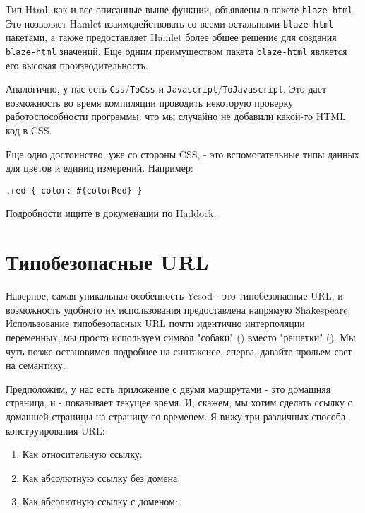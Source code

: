 Тип Html, как и все описанные выше функции, объявлены в пакете 
\texttt{blaze-html}. Это позволяет Hamlet взаимодействовать со всеми 
остальными \texttt{blaze-html} пакетами, а также предоставляет Hamlet 
более общее решение для создания \texttt{blaze-html} значений. 
Еще одним преимуществом пакета \texttt{blaze-html} является 
его высокая производительность.

Аналогично, у нас есть \lstinline!Css!/\lstinline!ToCss! и 
\lstinline!Javascript!/\lstinline!ToJavascript!. Это дает возможность во время
компиляции проводить некоторую проверку работоспособности программы: что мы 
случайно не добавили какой-то HTML код в CSS.

Еще одно достоинство, уже со стороны CSS, - это вспомогательные типы данных для 
цветов и единиц измерений. Например: 

\begin{lstlisting}
.red { color: #{colorRed} }
\end{lstlisting}

Подробности ищите в докуменации по Haddock.

\section{Типобезопасные URL}
Наверное, самая уникальная особенность Yesod - это типобезопасные URL, и 
возможность удобного их использования предоставлена напрямую Shakespeare.
Использование типобезопасных URL почти идентично интерполяции переменных,
мы просто используем символ "собаки" () вместо "решетки" (\textt{#}).
Мы чуть позже остановимся подробнее на синтаксисе, сперва, давайте прольем свет
на семантику.

Предположим, у нас есть приложение с двумя маршрутами 
 - это домашняя страница, и 
 - показывает текущее время.
И, скажем, мы хотим сделать ссылку с домашней страницы на страницу со временем.
Я вижу три различных способа конструирования URL:
\begin{enumerate}
  \item Как относительную ссылку: 
  \item Как абсолютную ссылку без домена: 
  \item Как абсолютную ссылку с доменом: 
\end{enumerate}

